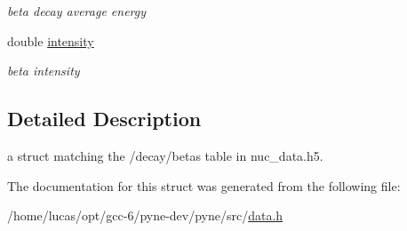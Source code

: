 \begin{DoxyCompactItemize}
\begin{DoxyCompactList}\small\item\em beta decay average energy \end{DoxyCompactList}\item 
double \hyperlink{structpyne_1_1beta_a9c2cd5b0d491324940bdd68bde23113a}{intensity}\hypertarget{structpyne_1_1beta_a9c2cd5b0d491324940bdd68bde23113a}{}\label{structpyne_1_1beta_a9c2cd5b0d491324940bdd68bde23113a}

\begin{DoxyCompactList}\small\item\em beta intensity \end{DoxyCompactList}\end{DoxyCompactItemize}


\subsection{Detailed Description}
a struct matching the \textquotesingle{}/decay/betas\textquotesingle{} table in nuc\+\_\+data.\+h5. 

The documentation for this struct was generated from the following file\+:\begin{DoxyCompactItemize}
\item 
/home/lucas/opt/gcc-\/6/pyne-\/dev/pyne/src/\hyperlink{data_8h}{data.\+h}\end{DoxyCompactItemize}
